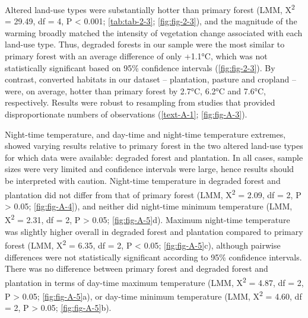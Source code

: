 \documentclass[12pt,a4paper,]{report}
\theoremstyle{definition}
\theoremstyle{definition}
\theoremstyle{definition}
\theoremstyle{remark}
\begin{document}
Altered land-use types were substantially hotter than primary forest
(LMM, Χ\textsuperscript{2} = 29.49, df = 4, P \textless{} 0.001;
\autoref{tab:tab-2-3}; \autoref{fig:fig-2-3}), and the magnitude of the
warming broadly matched the intensity of vegetation change associated
with each land-use type. Thus, degraded forests in our sample were the
most similar to primary forest with an average difference of only
+1.1°C, which was not statistically significant based on 95\% confidence
intervals (\autoref{fig:fig-2-3}). By contrast, converted habitats in
our dataset -- plantation, pasture and cropland -- were, on average,
hotter than primary forest by 2.7°C, 6.2°C and 7.6°C, respectively.
Results were robust to resampling from studies that provided
disproportionate numbers of observations (\autoref{text-A-1};
\autoref{fig:fig-A-3}).

Night-time temperature, and day-time and night-time temperature
extremes, showed varying results relative to primary forest in the two
altered land-use types for which data were available: degraded forest
and plantation. In all cases, sample sizes were very limited and
confidence intervals were large, hence results should be interpreted
with caution. Night-time temperature in degraded forest and plantation
did not differ from that of primary forest (LMM, Χ\textsuperscript{2} =
2.09, df = 2, P \textgreater{} 0.05; \autoref{fig:fig-A-4}), and neither
did night-time minimum temperature (LMM, Χ\textsuperscript{2} = 2.31, df
= 2, P \textgreater{} 0.05; \autoref{fig:fig-A-5}d). Maximum night-time
temperature was slightly higher overall in degraded forest and
plantation compared to primary forest (LMM, Χ\textsuperscript{2} = 6.35,
df = 2, P \textless{} 0.05; \autoref{fig:fig-A-5}c), although pairwise
differences were not statistically significant according to 95\%
confidence intervals. There was no difference between primary forest and
degraded forest and plantation in terms of day-time maximum temperature
(LMM, Χ\textsuperscript{2} = 4.87, df = 2, P \textgreater{} 0.05;
\autoref{fig:fig-A-5}a), or day-time minimum temperature (LMM,
Χ\textsuperscript{2} = 4.60, df = 2, P \textgreater{} 0.05;
\autoref{fig:fig-A-5}b).
\end{document}
